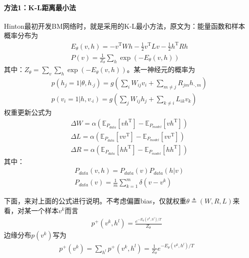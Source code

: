 {            \paragraph{方法1：K-L距离最小法}Hinton最初开发BM网络时，就是采用的K-L最小方法，原文为：能量函数和样本概率分布为
            \begin{align*}
            & E_\theta(v,h) = -v^\mathrm{T}Wh - \frac{1}{2} v^\mathrm{T}Lv - \frac{1}{2}h^\mathrm{T}Rh\\
            & P(v) = \frac{1}{Z_\theta}\sum_h \exp(-E_\theta(v,h) )
            \end{align*}
            其中：$Z_\theta = \sum_v\sum_h \exp(-E_\theta(v,h))$。某一神经元的概率为
            \begin{align*}
            & p(h_j=1|\theta,h_{\cdot j}) = g \left( \sum_i W_{ij}v_i+ \sum_{m\neq j}R_{jm}h_{\cdot,m} \right) \\
            & p(v_i=1|h,v_{\cdot i}) = g \left( \sum_j W_{ij}h_j+ \sum_{k\neq i}L_{ik}v_{k} \right)
            \end{align*}
            权重更新公式为
            \begin{align*}
            & \Delta W = \alpha \left( \mathbb{E}_{P_{data}}[vh^\mathrm{T}]  - \mathbb{E}_{P_{model}}[vh^\mathrm{T}] \right)\\
            & \Delta L = \alpha \left( \mathbb{E}_{P_{data}}[vv^\mathrm{T}]  - \mathbb{E}_{P_{model}}[vv^\mathrm{T}] \right)\\
            & \Delta R = \alpha \left( \mathbb{E}_{P_{data}}[hh^\mathrm{T}]  - \mathbb{E}_{P_{model}}[hh^\mathrm{T}] \right)
            \end{align*}
            其中：
            \begin{align*}
            & P_{data}(v,h) = P_{data}(v)P_{data}(h|v)\\
            & P_{data}(v) = \frac{1}{m} \sum_{k=1}^m\delta (v-v^k)
            \end{align*}
            \par
            下面，来对上面的公式进行说明。不考虑偏置bias，仅就权重$\theta\triangleq (W,R,L)$来看，对某一个样本$v^k$而言
            \begin{align*}
            p^+(v^k,h^l) = \frac{e^{-E_\theta(v^k,h^l)/T}}{Z_\theta}
            \end{align*}
            边缘分布$p(v^k)$写为
            \begin{align*}
            p^+(v^k) = \sum_{h^l}p^+(v^k,h^l) = \frac{1}{Z_\theta}e^{-E_\theta (v^k,h^l)/T}

\end{align*}}
